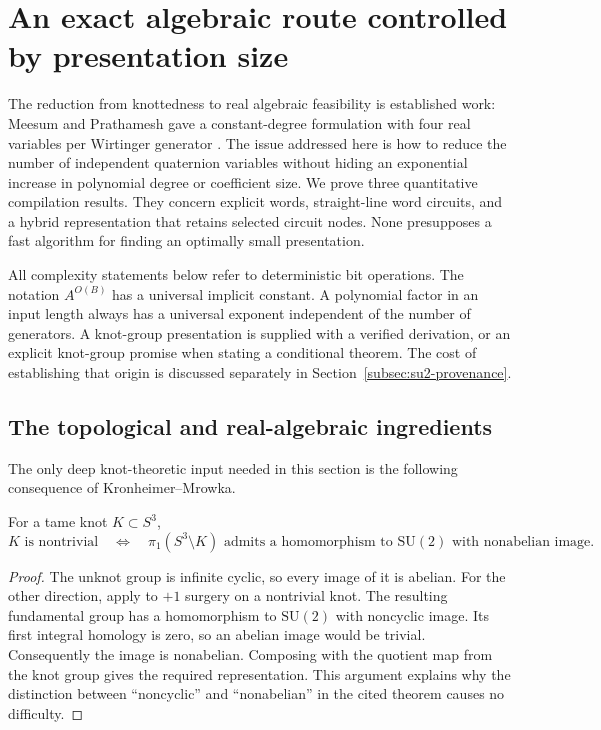 
\section{An exact algebraic route controlled by presentation size}
\label{sec:su2-presentation}

The reduction from knottedness to real algebraic feasibility is established
work: Meesum and Prathamesh gave a constant-degree formulation with four real
variables per Wirtinger generator \cite{MP2018}.  The issue addressed here is
how to reduce the number of independent quaternion variables without hiding
an exponential increase in polynomial degree or coefficient size.  We prove
three quantitative compilation results.  They concern explicit words,
straight-line word circuits, and a hybrid representation that retains selected
circuit nodes.  None presupposes a fast algorithm for finding an optimally
small presentation.

All complexity statements below refer to deterministic bit operations.
The notation $A^{O(B)}$ has a universal implicit constant.  A polynomial
factor in an input length always has a universal exponent independent of the
number of generators. A knot-group presentation is supplied with a verified
derivation, or an explicit knot-group promise when stating a conditional
theorem. The cost of establishing that origin is discussed separately
in Section~\ref{subsec:su2-provenance}.

\subsection{The topological and real-algebraic ingredients}

The only deep knot-theoretic input needed in this section is the following
consequence of Kronheimer--Mrowka.

\begin{theorem}
\label{thm:su2-detection}
For a tame knot $K\subset S^3$,
\[
 K\text{ is nontrivial}
 \quad\Longleftrightarrow\quad
 \pi_1(S^3\setminus K)\text{ admits a homomorphism to }\mathrm{SU}(2)
 \text{ with nonabelian image}.
\]
\end{theorem}

\begin{proof}
The unknot group is infinite cyclic, so every image of it is abelian.
For the other direction, apply \cite[Theorem~1]{KM2004SU2} to $+1$ surgery
on a nontrivial knot.  The resulting fundamental group has a homomorphism
to $\mathrm{SU}(2)$ with noncyclic image.  Its first integral homology is
zero, so an abelian image would be trivial.  Consequently the image is
nonabelian.  Composing with the quotient map from the knot group gives the
required representation.  This argument explains why the distinction between
``noncyclic'' and ``nonabelian'' in the cited theorem causes no difficulty.
\end{proof}

